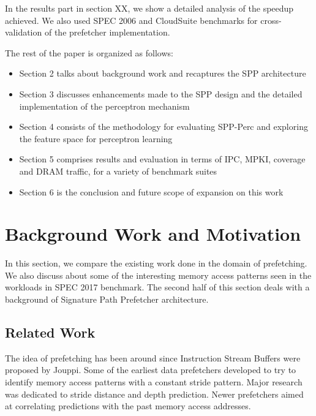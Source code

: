 \documentclass{sig-alternate}
\begin{document}
In the results part in section XX, we show a detailed analysis of the speedup achieved.
We also used SPEC 2006 and CloudSuite benchmarks for cross-validation of the prefetcher implementation.

\vspace{1ex}The rest of the paper is organized as follows:

\begin{itemize}
\item Section 2 talks about background work and recaptures the SPP architecture
\item Section 3 discusses enhancements made to the SPP design and the detailed implementation of the perceptron mechanism
\item Section 4 consists of the methodology for evaluating SPP-Perc and exploring the feature space for perceptron learning
\item Section 5 comprises results and evaluation in terms of IPC, MPKI, coverage and DRAM traffic, for a variety of benchmark suites
\item Section 6 is the conclusion and future scope of expansion on this work
\end{itemize}

\section{Background Work and Motivation}

In this section, we compare the existing work done in the domain of prefetching. 
We also discuss about some of the interesting memory access patterns seen in the workloads in SPEC 2017 benchmark. 
The second half of this section deals with a background of Signature Path Prefetcher architecture.

\subsection{Related Work}

The idea of prefetching has been around since Instruction Stream Buffers were proposed by Jouppi.
\cite{ISB}
Some of the earliest data prefetchers developed to try to identify memory access patterns with a constant stride pattern.
\cite{Smith} 
\cite{Baer}
\cite{Stride}
Major research was dedicated to stride distance and depth prediction.
\cite{Decoupled}
\cite{Adaptive}
Newer prefetchers aimed at correlating predictions with the past memory access addresses.
\cite{Address_Correlated} 
\cite{AMPM}
\end{document}

